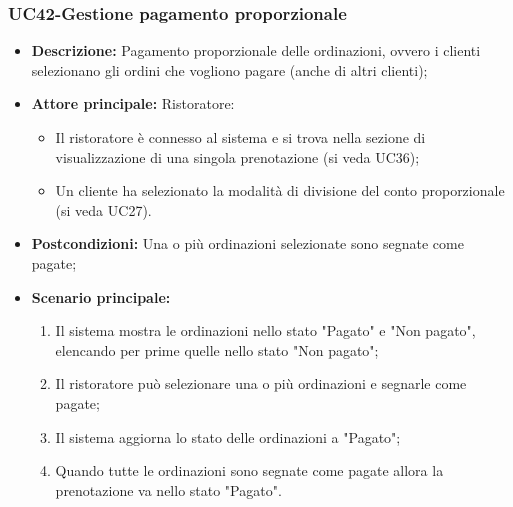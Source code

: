 \subsubsection{UC42-Gestione pagamento proporzionale}
\begin{itemize}
    \item \textbf{Descrizione:} Pagamento proporzionale delle ordinazioni, ovvero i clienti selezionano gli ordini che vogliono pagare (anche di altri clienti);
    \item \textbf{Attore principale:} Ristoratore:
    \begin{itemize}
        \item Il ristoratore è connesso al sistema e si trova nella sezione di visualizzazione di una singola prenotazione (si veda UC36);
        \item Un cliente ha selezionato la modalità di divisione del conto proporzionale (si veda UC27).
    \end{itemize}
    \item \textbf{Postcondizioni:} Una o più ordinazioni selezionate sono segnate come pagate;
    \item \textbf{Scenario principale:}
    \begin{enumerate}
        \item Il sistema mostra le ordinazioni nello stato "Pagato" e "Non pagato", elencando per prime quelle nello stato "Non pagato";
        \item Il ristoratore può selezionare una o più ordinazioni e segnarle come pagate;
        \item Il sistema aggiorna lo stato delle ordinazioni a "Pagato";
        \item Quando tutte le ordinazioni sono segnate come pagate allora la prenotazione va nello stato "Pagato".
    \end{enumerate}
\end{itemize}

